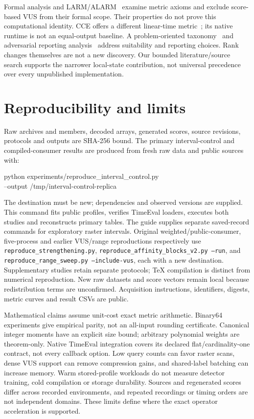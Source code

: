 Formal analysis and LARM/ALARM~\cite{wagner2025formallyexploringtimeseriesanomaly}
examine metric axioms and exclude score-based VUS from their formal scope.
Their properties do not prove this computational identity. CCE offers a
different linear-time metric~\cite{zhong2025cceconfidenceconsistencyevaluationtime};
its native runtime is not an equal-output baseline. A problem-oriented
taxonomy~\cite{yang2026problemorientedtaxonomyevaluationmetrics} and adversarial
reporting analysis~\cite{lyu2026didactuallyfixit} address suitability and
reporting choices. Rank changes themselves are not a new discovery. Our
bounded literature/source search supports the narrower local-state
contribution, not universal precedence over every unpublished implementation.

\section{Reproducibility and limits}
Raw archives and members, decoded arrays, generated scores, source revisions,
protocols and outputs are SHA-256 bound. The primary interval-control and
compiled-consumer results are produced from fresh raw data and public sources with:
\begin{flushleft}\small\ttfamily
python experiments/reproduce\_interval\_control.py\\
\hspace*{1em}--output /tmp/interval-control-replica
\end{flushleft}
The destination must be new; dependencies and observed versions are supplied.
This command fits public profiles, verifies TimeEval loaders, executes both
studies and reconstructs primary tables. The guide supplies separate saved-record
commands for exploratory raster intervals. Original weighted/public-consumer,
five-process and earlier VUS/range reproductions respectively use
\texttt{reproduce\_strengthening.py},
\texttt{reproduce\_affinity\_blocks\_v2.py --run}, and
\texttt{reproduce\_range\_sweep.py --include-vus}, each with a new destination.
Supplementary studies retain separate protocols; TeX compilation is distinct
from numerical reproduction. New raw datasets and score vectors remain local
because redistribution terms are unconfirmed. Acquisition instructions,
identifiers, digests, metric curves and result CSVs are public.

Mathematical claims assume unit-cost exact metric arithmetic. Binary64
experiments give empirical parity, not an all-input rounding certificate.
Canonical integer moments have an explicit size bound; arbitrary polynomial
weights are theorem-only. Native TimeEval integration covers its declared
flat/cardinality-one contract, not every callback option. Low query counts can
favor raster scans, dense VUS support can remove compression gains, and
shared-label batching can increase memory. Warm stored-profile workloads do
not measure detector training, cold compilation or storage durability. Sources
and regenerated scores differ across recorded environments, and repeated
recordings or timing orders are not independent domains. These limits define
where the exact operator acceleration is supported.

